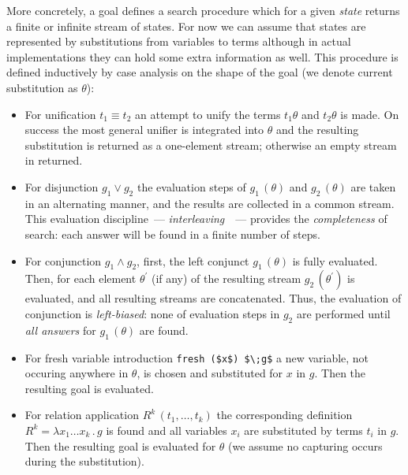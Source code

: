 More concretely, a goal defines a search procedure which for a given \emph{state} returns a finite or infinite stream of states. For now we can assume that states are represented by
substitutions from variables to terms although in actual implementations they can hold some extra information as well. This procedure is defined inductively by case analysis on the
shape of the goal (we denote current substitution as $\theta$):

\begin{itemize}
\item For unification $t_1 \equiv t_2$ an attempt to unify the terms $t_1\theta$ and $t_2\theta$ is made. On success the most general unifier is integrated into $\theta$ and the resulting substitution
  is returned as a one-element stream; otherwise an empty stream in returned.

\item For disjunction $g_1 \vee g_2$ the evaluation steps of $g_1\,(\theta)$ and $g_2\,(\theta)$ are taken in an alternating manner, and the results are collected in a common stream. This evaluation
  discipline~--- \emph{interleaving}~\cite{fair:interleaving}~--- provides the \emph{completeness} of \mk search: each answer will be found in a finite number of steps.

\item For conjunction $g_1 \wedge g_2$, first, the left conjunct $g_1\,(\theta)$ is fully evaluated. Then, for each element $\theta^\prime$ (if any) of the resulting stream $g_2\,(\theta^\prime)$ is
  evaluated, and all resulting streams are concatenated. Thus, the evaluation of conjunction is \emph{left-biased}: none of evaluation steps in $g_2$ are performed until \emph{all answers} for
  $g_1\,(\theta)$ are found.

\item For fresh variable introduction \lstinline|fresh ($x$) $\;g$| a new variable, not occuring anywhere in $\theta$, is chosen and substituted for $x$ in $g$. Then the resulting goal is evaluated.

\item For relation application $R^k\,(t_1,\dots,t_k)$ the corresponding definition $R^k=\lambda x_1\dots x_k\,.\,g$ is found and all variables $x_i$ are substituted by terms $t_i$ in
  $g$. Then the resulting goal is evaluated for $\theta$ (we assume no capturing occurs during the substitution).
\end{itemize}

